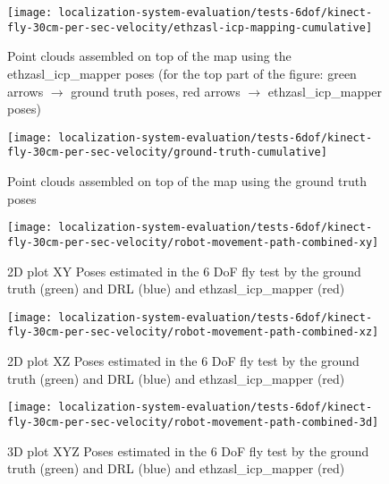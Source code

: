 \begin{figure}[H]
	\centering
	\texttt{[image: localization-system-evaluation/tests-6dof/kinect-fly-30cm-per-sec-velocity/ethzasl-icp-mapping-cumulative]}
	\caption{Point clouds assembled on top of the map using the ethzasl\_icp\_mapper poses (for the top part of the figure: green arrows $\rightarrow$ ground truth poses, red arrows $\rightarrow$ ethzasl\_icp\_mapper poses)}
	\label{fig:localization-system-evaluation_kinect-fly-30cm-per-sec-velocity-ethzasl-icp-mapping-cumulative}
\end{figure}

\begin{figure}[H]
	\centering
	\texttt{[image: localization-system-evaluation/tests-6dof/kinect-fly-30cm-per-sec-velocity/ground-truth-cumulative]}
	\caption{Point clouds assembled on top of the map using the ground truth poses}
	\label{fig:localization-system-evaluation_kinect-fly-30cm-per-sec-velocity-gt-cumulative}
\end{figure}


\begin{figure}[H]
	\centering
	\texttt{[image: localization-system-evaluation/tests-6dof/kinect-fly-30cm-per-sec-velocity/robot-movement-path-combined-xy]}
	\caption{2D plot XY Poses estimated in the 6 DoF fly test by the ground truth (green) and DRL (blue) and ethzasl\_icp\_mapper (red)}
	\label{fig:localization-system-evaluation_kinect-fly-robot-movement-path-combined-xy}
\end{figure}

\begin{figure}[H]
	\centering
	\hspace*{0.25cm}\texttt{[image: localization-system-evaluation/tests-6dof/kinect-fly-30cm-per-sec-velocity/robot-movement-path-combined-xz]}
	\caption{2D plot XZ Poses estimated in the 6 DoF fly test by the ground truth (green) and DRL (blue) and ethzasl\_icp\_mapper (red)}
	\label{fig:localization-system-evaluation_kinect-fly-robot-movement-path-combined-xz}
\end{figure}

\begin{figure}[H]
	\centering
	\texttt{[image: localization-system-evaluation/tests-6dof/kinect-fly-30cm-per-sec-velocity/robot-movement-path-combined-3d]}
	\caption{3D plot XYZ Poses estimated in the 6 DoF fly test by the ground truth (green) and DRL (blue) and ethzasl\_icp\_mapper (red)}
	\label{fig:localization-system-evaluation_kinect-fly-robot-movement-path-combined-3d}
\end{figure}


